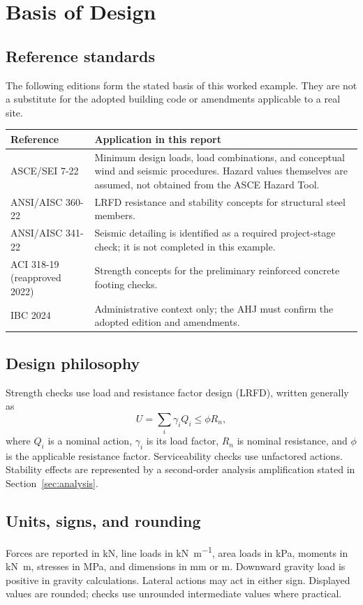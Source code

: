 \section{Basis of Design}

\subsection{Reference standards}
The following editions form the stated basis of this worked example. They are not a
substitute for the adopted building code or amendments applicable to a real site.

\begin{longtable}{@{}p{33mm}p{115mm}@{}}
  \toprule
  \textbf{Reference} & \textbf{Application in this report} \\
  \midrule
  \endhead
  ASCE/SEI 7-22 & Minimum design loads, load combinations, and conceptual wind and
    seismic procedures. Hazard values themselves are assumed, not obtained from the
    ASCE Hazard Tool. \\
  ANSI/AISC 360-22 & LRFD resistance and stability concepts for structural steel
    members. \\
  ANSI/AISC 341-22 & Seismic detailing is identified as a required project-stage
    check; it is not completed in this example. \\
  ACI 318-19 (reapproved 2022) & Strength concepts for the preliminary reinforced
    concrete footing checks. \\
  IBC 2024 & Administrative context only; the AHJ must confirm the adopted edition
    and amendments. \\
  \bottomrule
\end{longtable}

\subsection{Design philosophy}
Strength checks use load and resistance factor design (LRFD), written generally as
\begin{equation}
  U = \sum_i \gamma_i Q_i \leq \phi R_n,
  \label{eq:lrfd}
\end{equation}
where $Q_i$ is a nominal action, $\gamma_i$ is its load factor, $R_n$ is nominal
resistance, and $\phi$ is the applicable resistance factor. Serviceability checks use
unfactored actions. Stability effects are represented by a second-order analysis
amplification stated in Section~\ref{sec:analysis}.

\subsection{Units, signs, and rounding}
Forces are reported in \si{\kilo\newton}, line loads in
\si{\kilo\newton\per\metre}, area loads in \si{\kilo\pascal}, moments in
\si{\kilo\newton\metre}, stresses in \si{\mega\pascal}, and dimensions in
\si{\milli\metre} or \si{\metre}. Downward gravity load is positive in gravity
calculations. Lateral actions may act in either sign. Displayed values are rounded;
checks use unrounded intermediate values where practical.

